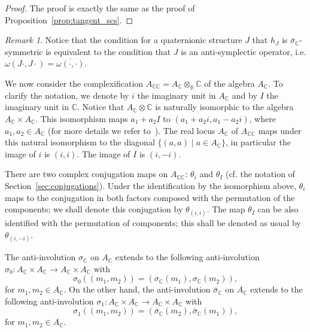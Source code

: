 \documentclass[oneside,11pt]{amsart}
\theoremstyle{definition}
\theoremstyle{remark}
\newtheorem{rem}[thm]{Remark}
\numberwithin{thm}{section}
\numberwithin{equation}{section}
\begin{document}
\begin{proof} The proof is exactly the same as the proof of Proposition~\ref{prop:tangent_scs}.
\end{proof}

\begin{rem}
    Notice that the condition for a quaternionic structure $J$ that $h_J$ is $\bar\sigma_\mathbb C$-symmetric is equivalent to the condition that $J$ is an anti-symplectic operator, i.e. $\omega(J\cdot,J\cdot)=\overline{\omega(\cdot,\cdot)}$.
\end{rem}

We now consider the complexification $A_{\mathbb{CC}}=A_\mathbb C\otimes_\mathbb R \mathbb C$ of the algebra $A_{\mathbb{C}}$. To clarify the notation, we denote by $i$ the imaginary unit in $A_\mathbb C$ and by $I$  the imaginary unit in $\mathbb C$. Notice that $A_\mathbb C\otimes \mathbb C$ is naturally isomorphic to the algebra $A_\mathbb C\times A_\mathbb C$. This isomorphism maps $a_1+a_2I$ to $(a_1+a_2i,a_1-a_2i)$, where $a_1,a_2\in A_\mathbb C$ (for more details we refer to~\cite[Appendix~B.1.1]{ABRRW}). The real locus $A_{\mathbb C}$ of $A_\mathbb{CC}$ maps under this natural isomorphism to the diagonal $\{(a,a)\mid a\in A_\mathbb C\}$, in particular the image of $i$ is $(i,i)$. The image of $I$ is $(i,-i)$. 

There are two complex conjugation maps on $A_\mathbb {CC}$: $\theta_i$ and $\theta_I$ (cf. the notation of Section~\ref{sec:conjugations}). Under the identification by the isomorphism above, $\theta_i$ maps to the conjugation in both factors composed with the permutation of the components; we shall denote this conjugation by $\theta_{(i,i)}$. The map $\theta_I$ can be also identified with the permutation of components; this shall be denoted as usual by $\theta_{(i,-i)}$. 

The anti-involution $\sigma_\mathbb C$ on $A_\mathbb C$ extends to the following anti-involution $\sigma_0\colon A_{\mathbb C}\times A_{\mathbb C} \to A_{\mathbb C}\times A_{\mathbb C}$ with 
$$\sigma_0\left((m_1,m_2)\right)=(\sigma_\mathbb C(m_1),\sigma_\mathbb C(m_2)),$$
for $m_1,m_2\in A_\mathbb C$.  On the other hand, the anti-involution $\bar\sigma_\mathbb C$ on $A_\mathbb C$ extends to the following anti-involution $\sigma_1\colon A_{\mathbb C}\times A_{\mathbb C} \to A_{\mathbb C}\times A_{\mathbb C}$ with $$\sigma_1\left((m_1,m_2)\right)= (\bar\sigma_\mathbb C(m_2),\bar\sigma_\mathbb C(m_1)),$$ for $m_1,m_2\in A_\mathbb C$. 
\end{document}
